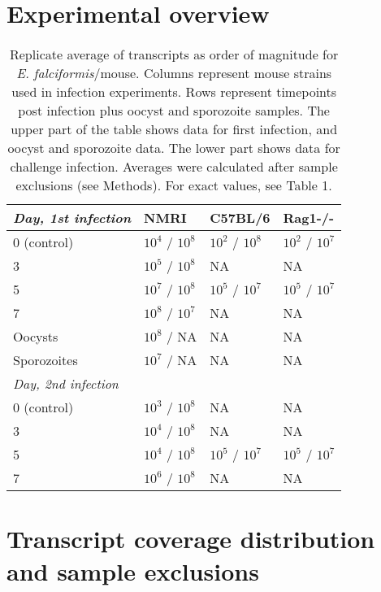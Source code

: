\documentclass{article}
\begin{document}
\section{Experimental overview}
	\setlength{\tabcolsep}{14pt}
	\begin{table}[H]
	\begin{center}
	\caption{Replicate average of transcripts as order of magnitude for \textit{E. falciformis}/mouse. 
		Columns represent mouse strains used in infection experiments. Rows represent timepoints post 
		infection plus oocyst and sporozoite samples. The upper part of the table shows data for first 
		infection, and oocyst and sporozoite data. The lower part shows data for challenge infection. 
		Averages were calculated after sample exclusions (see Methods). For exact values, see Table 1.}
\begin{tabular}{*4l}    \toprule
\textit{Day, 1st infection}  	& NMRI  & C57BL/6  & Rag1-/- \\ \midrule
	0 (control)    & $10^4$ / $10^8$  & $10^2$ / $10^8$  & $10^2$ / $10^7$  \\ %
3  		& $10^5$ / $10^8$ & NA  & NA \\ 
5  		& $10^7$ / $10^8$ & $10^5$ / $10^7$  & $10^5$ / $10^7$ \\
7  		& $10^8$ / $10^7$ & NA  & NA \\ 
Oocysts 	& $10^8$ / NA & NA  & NA \\ 
Sporozoites 	& $10^7$ / NA & NA  & NA \\ \midrule

\textit{Day, 2nd infection}  	\\ \midrule
0 (control)     & $10^3$ / $10^8$  &  NA  & NA  \\ %
3  		& $10^4$ / $10^8$ & NA  & NA \\ 
5  		& $10^4$ / $10^8$ & $10^5$ / $10^7$  & $10^5$ / $10^7$ \\
7  		& $10^6$ / $10^8$ & NA  & NA \\ 
	
	
	\bottomrule
 \hline
\end{tabular}
\end{center}
\end{table}


\section{Transcript coverage distribution and sample exclusions}
\end{document}
